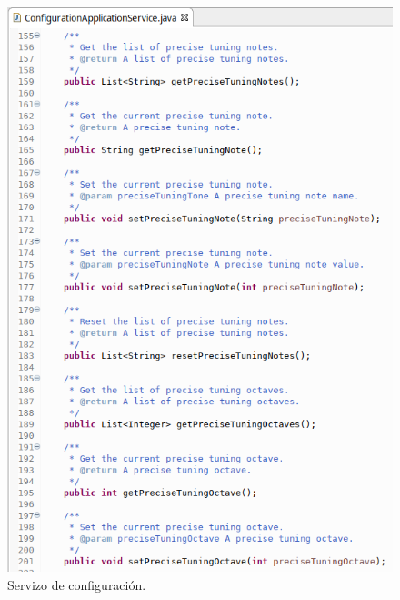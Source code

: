    \begin{figure}[htbp]
    \centering
    \includegraphics[scale=0.6, keepaspectratio=true]{./imagenes/servizo-configuracion-4.png}
    \caption{Servizo de configuración.}
    \label{figura:ServizoConfiguracion4}
   \end{figure}
   

